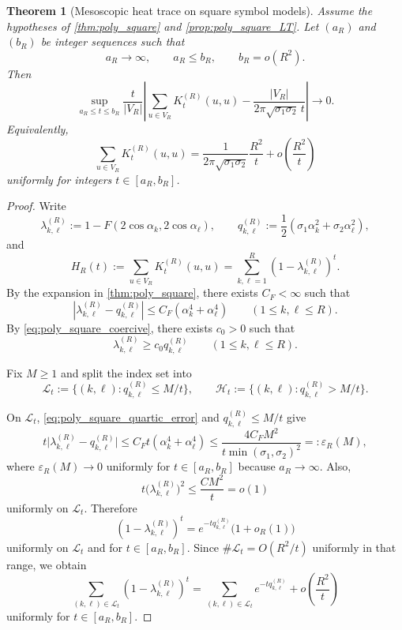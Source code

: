 \documentclass[reqno]{amsart}
\numberwithin{equation}{section}
\newtheorem{theorem}{Theorem}[section]
\theoremstyle{definition}
\theoremstyle{remark}
\newcommand{\Cref}[1]{\autoref{#1}}
\begin{document}
\begin{theorem}[Mesoscopic heat trace on square symbol models]\label{thm:poly_square_heat_trace}
Assume the hypotheses of \Cref{thm:poly_square} and \Cref{prop:poly_square_LT}. Let $(a_R)$ and $(b_R)$ be integer sequences such that
\[
  a_R\longrightarrow\infty,
  \qquad
  a_R\le b_R,
  \qquad
  b_R=o(R^2).
\]
Then
\[
  \sup_{a_R\le t\le b_R}
  \frac{t}{|V_R|}
  \left|
    \sum_{u\in V_R} K_t^{(R)}(u,u)
    -
    \frac{|V_R|}{2\pi\sqrt{\sigma_1\sigma_2}\,t}
  \right|
  \longrightarrow 0.
\]
Equivalently,
\[
  \sum_{u\in V_R} K_t^{(R)}(u,u)
  =
  \frac{1}{2\pi\sqrt{\sigma_1\sigma_2}}\frac{R^2}{t}
  + o\!\left(\frac{R^2}{t}\right)
\]
uniformly for integers $t\in[a_R,b_R]$.
\end{theorem}

\begin{proof}
Write
\[
  \lambda_{k,\ell}^{(R)}:=1-F(2\cos\alpha_k,2\cos\alpha_\ell),
  \qquad
  q_{k,\ell}^{(R)}:=\frac12(\sigma_1\alpha_k^2+\sigma_2\alpha_\ell^2),
\]
and
\[
  H_R(t):=\sum_{u\in V_R}K_t^{(R)}(u,u)=\sum_{k,\ell=1}^R (1-\lambda_{k,\ell}^{(R)})^t.
\]
By the expansion in \Cref{thm:poly_square}, there exists $C_F<\infty$ such that
\begin{equation}\label{eq:poly_square_quartic_error}
  \left|
    \lambda_{k,\ell}^{(R)}-q_{k,\ell}^{(R)}
  \right|
  \le
  C_F(\alpha_k^4+\alpha_\ell^4)
  \qquad(1\le k,\ell\le R).
\end{equation}
By \eqref{eq:poly_square_coercive}, there exists $c_0>0$ such that
\begin{equation}\label{eq:poly_square_q_compare}
  \lambda_{k,\ell}^{(R)}\ge c_0 q_{k,\ell}^{(R)}
  \qquad(1\le k,\ell\le R).
\end{equation}

Fix $M\ge1$ and split the index set into
\[
  \mathcal L_t:=\{(k,\ell): q_{k,\ell}^{(R)}\le M/t\},
  \qquad
  \mathcal H_t:=\{(k,\ell): q_{k,\ell}^{(R)}> M/t\}.
\]

On $\mathcal L_t$, \eqref{eq:poly_square_quartic_error} and $q_{k,\ell}^{(R)}\le M/t$ give
\[
  t\bigl|\lambda_{k,\ell}^{(R)}-q_{k,\ell}^{(R)}\bigr|
  \le
  C_F t(\alpha_k^4+\alpha_\ell^4)
  \le
  \frac{4C_F M^2}{t\min(\sigma_1,\sigma_2)^2}
  =: \varepsilon_R(M),
\]
where $\varepsilon_R(M)\to0$ uniformly for $t\in[a_R,b_R]$ because $a_R\to\infty$. Also,
\[
  t\bigl(\lambda_{k,\ell}^{(R)}\bigr)^2
  \le \frac{C M^2}{t}=o(1)
\]
uniformly on $\mathcal L_t$. Therefore
\[
  (1-\lambda_{k,\ell}^{(R)})^t
  =
  e^{-t q_{k,\ell}^{(R)}}\bigl(1+o_R(1)\bigr)
\]
uniformly on $\mathcal L_t$ and for $t\in[a_R,b_R]$. Since $\#\mathcal L_t=O(R^2/t)$ uniformly in that range, we obtain
\begin{equation}\label{eq:poly_square_low_freq}
  \sum_{(k,\ell)\in\mathcal L_t}(1-\lambda_{k,\ell}^{(R)})^t
  =
  \sum_{(k,\ell)\in\mathcal L_t}e^{-t q_{k,\ell}^{(R)}}
  + o\!\left(\frac{R^2}{t}\right)
\end{equation}
uniformly for $t\in[a_R,b_R]$.


\end{proof}
\end{document}
